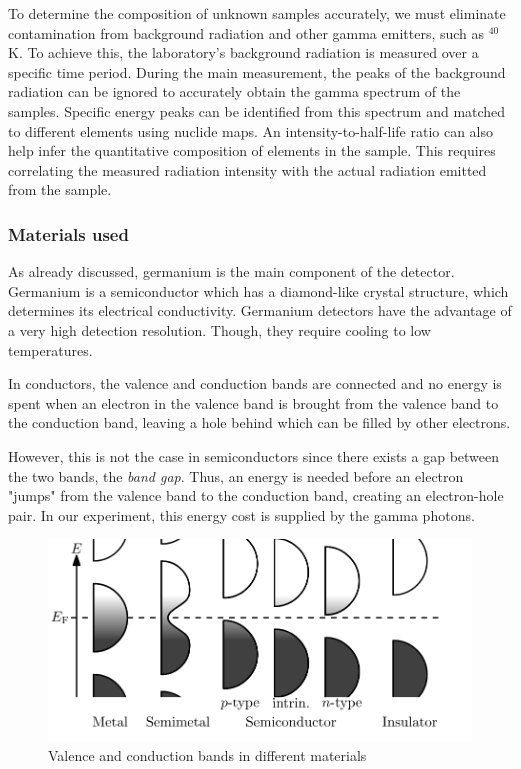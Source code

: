 \documentclass{article}
\begin{document}
To determine the composition of unknown samples accurately, we must eliminate contamination from background radiation and other gamma emitters, such as $^{40}$K. To achieve this, the laboratory's background radiation is measured over a specific time period. During the main measurement, the peaks of the background radiation can be ignored to accurately obtain the gamma spectrum of the samples. Specific energy peaks can be identified from this spectrum and matched to different elements using nuclide maps. An intensity-to-half-life ratio can also help infer the quantitative composition of elements in the sample. This requires correlating the measured radiation intensity with the actual radiation emitted from the sample.

\subsubsection{Materials used}
As already discussed, germanium is the main component of the detector. Germanium is a semiconductor which has a diamond-like crystal structure, which determines its electrical conductivity. Germanium detectors have the advantage of a very high detection resolution. Though, they require cooling to low temperatures. 

In conductors, the valence and conduction bands are connected and no energy is spent when an electron in the valence band is brought from the valence band to the conduction band, leaving a hole behind which can be filled by other electrons. 

However, this is not the case in semiconductors since there exists a gap between the two bands, the \textit{band gap}. Thus, an energy is needed before an electron "jumps" from the valence band to the conduction band, creating an electron-hole pair. In our experiment, this energy cost is supplied by the gamma photons.

\begin{figure}[h]
    \centering
    \includegraphics[width=0.5\linewidth]{Figures/Intro/7.png}
    \caption{Valence and conduction bands in different materials \cite{wikipediacontributors_2019_valence}}
    \label{fig:bands}
\end{figure}
\end{document}
